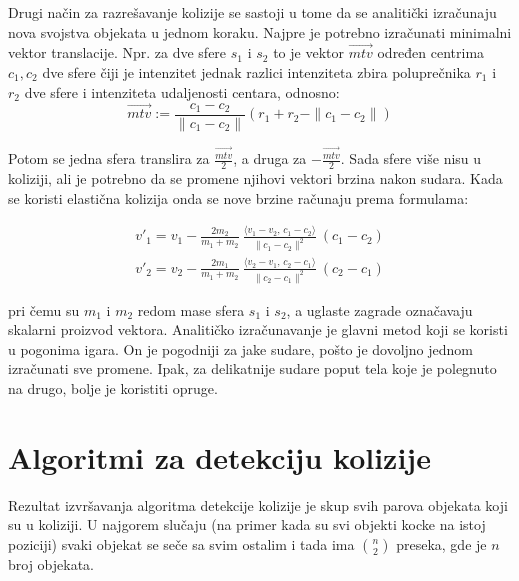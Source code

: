 \documentclass[12pt,oneside]{memoir}
\begin{document}
Drugi način za razrešavanje kolizije se sastoji u tome da se analitički izračunaju nova svojstva objekata u jednom koraku.
Najpre je potrebno izračunati minimalni vektor translacije. Npr. za dve sfere $s_1$ i $s_2$ to je vektor $\overrightarrow{mtv}$
određen centrima $c_1, c_2$ dve sfere čiji je intenzitet jednak razlici intenziteta zbira poluprečnika
$r_1$ i $r_2$ dve sfere i intenziteta udaljenosti centara, odnosno:
\begin{equation}
	\label{eq:mtv}
	 \overrightarrow{mtv} := \frac{{c_1 - c_2}} {\|{c_1 - c_2}\|} 
	(r_1 + r_2 - \| {c_1 - c_2} \| ) 
\end{equation}

Potom se jedna sfera translira za $ \frac{ \overrightarrow{mtv} }{ 2 }$, a druga za $ -\frac{ \overrightarrow{mtv} }{ 2 }$.
Sada sfere više nisu u koliziji, ali je potrebno da se promene njihovi vektori brzina nakon sudara.
Kada se koristi elastična kolizija onda se nove brzine računaju prema formulama:


\begin{equation}
	\label{eq:razresenje}
	\begin{split}
		{v}'_1= {v}_1-\frac{2 m_2}{m_1+m_2} \ \frac{\langle  {v}_1- {v}_2,\, {c}_1- {c}_2\rangle}{\| {c}_1- {c}_2\|^2} \ ( {c}_1- {c}_2) \\
		{v}'_2= {v}_2-\frac{2 m_1}{m_1+m_2} \ \frac{\langle  {v}_2- {v}_1,\, {c}_2- {c}_1\rangle}{\| {c}_2- {c}_1\|^2} \ ( {c}_2- {c}_1) 
	\end{split}
\end{equation}


\noindent pri čemu su $m_1$ i $m_2$ redom mase sfera $s_1$ i $s_2$, a uglaste zagrade označavaju skalarni proizvod vektora.
Analitičko izračunavanje je glavni metod koji se koristi u pogonima igara.
On je pogodniji za jake sudare, pošto je dovoljno jednom izračunati sve promene.
Ipak, za delikatnije sudare poput tela koje je polegnuto na drugo, bolje je koristiti opruge.

\chapter{Algoritmi za detekciju kolizije}
\label{sec:algoritmi}

Rezultat izvršavanja algoritma detekcije kolizije je skup svih parova objekata koji su u koliziji.
U najgorem slučaju (na primer kada su svi objekti kocke na istoj poziciji) svaki objekat se seče sa svim ostalim
i tada ima $ {n\choose 2}  $ preseka, gde je $n$ broj objekata. 
\end{document}
